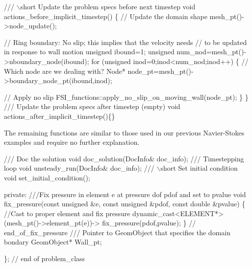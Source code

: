 \begin{DoxyCodeInclude}

\textcolor{comment}{}
\textcolor{comment}{ /// \(\backslash\)short Update the problem specs before next timestep}
\textcolor{comment}{} \textcolor{keywordtype}{void} actions\_before\_implicit\_timestep()
  \{
   \textcolor{comment}{// Update the domain shape}
   mesh\_pt()->node\_update();

   \textcolor{comment}{// Ring boundary: No slip; this implies that the velocity needs}
   \textcolor{comment}{// to be updated in response to wall motion}
   \textcolor{keywordtype}{unsigned} ibound=1;
   \textcolor{keywordtype}{unsigned} num\_nod=mesh\_pt()->nboundary\_node(ibound);
   \textcolor{keywordflow}{for} (\textcolor{keywordtype}{unsigned} inod=0;inod<num\_nod;inod++)
    \{
     \textcolor{comment}{// Which node are we dealing with?}
     Node* node\_pt=mesh\_pt()->boundary\_node\_pt(ibound,inod);
     
     \textcolor{comment}{// Apply no slip}
     FSI\_functions::apply\_no\_slip\_on\_moving\_wall(node\_pt);
    \}
  \} 
\textcolor{comment}{}
\textcolor{comment}{ /// Update the problem specs after timestep (empty)}
\textcolor{comment}{} \textcolor{keywordtype}{void} actions\_after\_implicit\_timestep()\{\}

\end{DoxyCodeInclude}


The remaining functions are similar to those used in our previous Navier-\/\+Stokes examples and require no further explanation.


\begin{DoxyCodeInclude}
 \textcolor{comment}{}
\textcolor{comment}{ /// Doc the solution}
\textcolor{comment}{} \textcolor{keywordtype}{void} doc\_solution(DocInfo& doc\_info);
\textcolor{comment}{}
\textcolor{comment}{ /// Timestepping loop}
\textcolor{comment}{} \textcolor{keywordtype}{void} unsteady\_run(DocInfo& doc\_info);
\textcolor{comment}{}
\textcolor{comment}{ /// \(\backslash\)short Set initial condition}
\textcolor{comment}{} \textcolor{keywordtype}{void} set\_initial\_condition();

\textcolor{keyword}{private}:
\textcolor{comment}{}
\textcolor{comment}{ ///Fix pressure in element e at pressure dof pdof and set to pvalue}
\textcolor{comment}{} \textcolor{keywordtype}{void} fix\_pressure(\textcolor{keyword}{const} \textcolor{keywordtype}{unsigned} &e, \textcolor{keyword}{const} \textcolor{keywordtype}{unsigned} &pdof, 
                   \textcolor{keyword}{const} \textcolor{keywordtype}{double} &pvalue)
  \{
   \textcolor{comment}{//Cast to proper element and fix pressure}
   \textcolor{keyword}{dynamic\_cast<}ELEMENT*\textcolor{keyword}{>}(mesh\_pt()->element\_pt(e))->
    fix\_pressure(pdof,pvalue);
  \} \textcolor{comment}{// end\_of\_fix\_pressure}
\textcolor{comment}{}
\textcolor{comment}{ /// Pointer to GeomObject that specifies the domain bondary}
\textcolor{comment}{} GeomObject* Wall\_pt;

\}; \textcolor{comment}{// end of problem\_class}

\end{DoxyCodeInclude}





